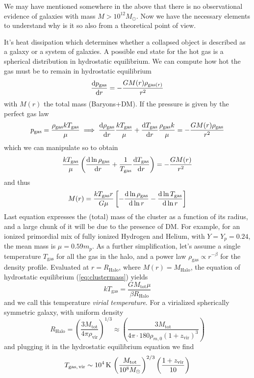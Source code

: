 We may have mentioned somewhere in the above that there is no observational evidence of galaxies with mass $M>10^{12}M_{\odot}$. Now we have the necessary elements to understand why is it so also from a theoretical point of view.
\par It's heat dissipation which determines whether a collapsed object is described as a galaxy or a system of galaxies. A possible end state for the hot gas is a spherical distribution in hydrostatic equilibrium. We can compute how hot the gas must be to remain in hydrostatic equilibrium
\begin{equation*}
    \frac{\text{d}p_{\text{gas}}}{\text{d}r} = -\frac{GM(r)\rho_{\text{gas}(r)}}{r^{2}}
\end{equation*}
with $M(r)$ the total mass (Baryons+DM). If the pressure is given by the perfect gas law 
\begin{equation*}
    p_{\text{gas}} = \frac{\rho_{\text{gas}}kT_{\text{gas}}}{\mu} \implies \frac{\text{d}\rho_{\text{gas}}}{\text{d}r}\frac{kT_{\text{gas}}}{\mu}+\frac{\text{d}T_{\text{gas}}}{\text{d}r}\frac{\rho_{\text{gas}}k}{\mu} = -\frac{GM(r)\rho_{\text{gas}}}{r^{2}}
\end{equation*}
which we can manipulate so to obtain 
\begin{equation*}
    \frac{kT_{\text{gas}}}{\mu}\left(\frac{\text{d}\ln \rho_{\text{gas}}}{\text{d}r}+ \frac{1}{T_{\text{gas}}}\frac{\text{d}T_{\text{gas}}}{\text{d}r}\right) = -\frac{GM(r)}{r^{2}}
\end{equation*}
and thus 
\begin{equation}
    M(r) = \frac{kT_{\text{gas}}r}{G\mu}\left[-\frac{\text{d}\ln\rho_{\text{gas}}}{\text{d}\ln r}-\frac{\text{d}\ln T_{\text{gas}}}{\text{d}\ln r}\right]
    \label{eq:clustermass}
\end{equation}
Last equation expresses the (total) mass of the cluster as a function of its radius, and a large chunk of it will be due to the presence of DM. For example, for an ionized primordial mix of fully ionized Hydrogen and Helium, with $Y=Y_{p} = 0.24$, the mean mass is $\mu = 0.59m_{p}$. As a further simplification, let's assume a single temperature $T_{\text{gas}}$ for all the gas in the halo, and a power law $\rho_{\text{gas}}\propto r^{-\beta}$ for the density profile. Evaluated at $r=R_{\text{Halo}}$, where $M(r)=M_{\text{Halo}}$, the equation of hydrostatic equilibrium (\ref{eq:clustermass}) yields
\begin{equation*}
    kT_{\text{gas}} = \frac{GM_{\text{tot}}\mu}{\beta R_{\text{Halo}}}
\end{equation*}
and we call this temperature \emph{virial temperature}. For a virialized spherically symmetric galaxy, with uniform density
\begin{equation*}
    R_{\text{Halo}} = \left(\frac{3M_{\text{tot}}}{4\pi\rho_{\text{vir}}}\right)^{1/3} \approx \left(\frac{3M_{\text{tot}}}{4\pi \cdot 180\rho_{m,0}(1+z_{\text{vir}})^{3}}\right)
\end{equation*}
and plugging it in the hydrostatic equilibrium equation we find 
\begin{equation}
    T_{\text{gas,\,vir}} \sim 10^{4}\,\text{K}\,\left(\frac{M_{\text{tot}}}{10^{8}M_{\odot}}\right)^{2/3}\left(\frac{1+z_{\text{vir}}}{10}\right)
    \label{eq:virialtemperaturesimple}
\end{equation}


